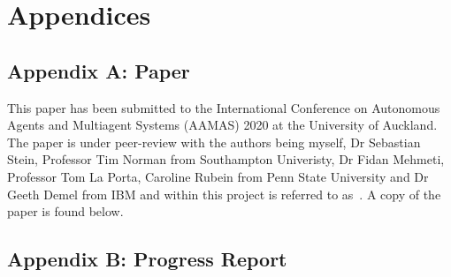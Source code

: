 \chapter*{Appendices}
\section*{Appendix A: Paper} \label{app:aamas_paper} %
This paper has been submitted to the International Conference on Autonomous Agents and Multiagent Systems (AAMAS)
2020 at the University of Auckland. The paper is under peer-review with the authors being myself, Dr Sebastian Stein,
Professor Tim Norman from Southampton Univeristy, Dr Fidan Mehmeti, Professor Tom La Porta, Caroline Rubein from
Penn State University and Dr Geeth Demel from IBM and within this project is referred to
as~\cite{FlexibleResourceAllocation}. A copy of the paper is found below.










\section*{Appendix B: Progress Report} \label{app:progress_report}
